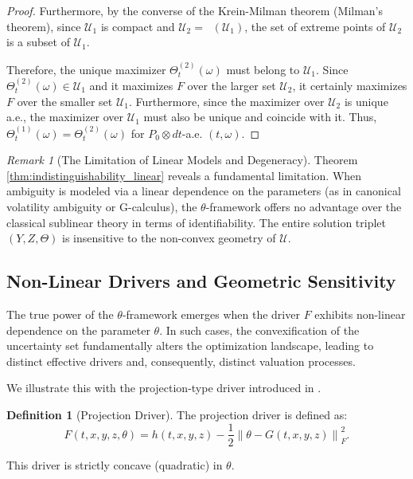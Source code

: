 \documentclass[12pt, letterpaper]{amsart}
\newcommand{\Ucal}{\mathcal{U}}
\newcommand{\norm}[1]{\left\lVert#1\right\rVert}
\DeclareMathOperator*{\overlineconv}{\overline{conv}}
\theoremstyle{plain}
\theoremstyle{definition}
\newtheorem{definition}[theorem]{Definition}
\theoremstyle{remark}
\newtheorem{remark}[theorem]{Remark}
\numberwithin{equation}{section} %
\begin{document}
\begin{proof}
Furthermore, by the converse of the Krein-Milman theorem (Milman's theorem), since \(\Ucal_1\) is compact and \(\Ucal_2 = \overlineconv(\Ucal_1)\), the set of extreme points of \(\Ucal_2\) is a subset of \(\Ucal_1\).

Therefore, the unique maximizer \(\Theta^{(2)}_t(\omega)\) must belong to \(\Ucal_1\). Since \(\Theta^{(2)}_t(\omega) \in \Ucal_1\) and it maximizes \(F\) over the larger set \(\Ucal_2\), it certainly maximizes \(F\) over the smaller set \(\Ucal_1\). Furthermore, since the maximizer over \(\Ucal_2\) is unique a.e., the maximizer over \(\Ucal_1\) must also be unique and coincide with it.
Thus, \(\Theta^{(1)}_t(\omega) = \Theta^{(2)}_t(\omega)\) for \(P_0 \otimes dt\)-a.e. \((t,\omega)\).
\end{proof}

\begin{remark}[The Limitation of Linear Models and Degeneracy]
\label{rem:limitation_linear}
Theorem \ref{thm:indistinguishability_linear} reveals a fundamental limitation. When ambiguity is modeled via a linear dependence on the parameters (as in canonical volatility ambiguity or G-calculus), the \(\theta\)-framework offers no advantage over the classical sublinear theory in terms of identifiability. The entire solution triplet \((Y, Z, \Theta)\) is insensitive to the non-convex geometry of \(\Ucal\).
\end{remark}

\subsection{Non-Linear Drivers and Geometric Sensitivity}

The true power of the \(\theta\)-framework emerges when the driver \(F\) exhibits non-linear dependence on the parameter \(\theta\). In such cases, the convexification of the uncertainty set fundamentally alters the optimization landscape, leading to distinct effective drivers and, consequently, distinct valuation processes.

We illustrate this with the projection-type driver introduced in .

\begin{definition}[Projection Driver]
The projection driver is defined as:
\[ F(t,x,y,z,\theta) = h(t,x,y,z) - \frac{1}{2}\norm{\theta - G(t,x,y,z)}_F^2. \]
\end{definition}
This driver is strictly concave (quadratic) in \(\theta\).
\end{document}
